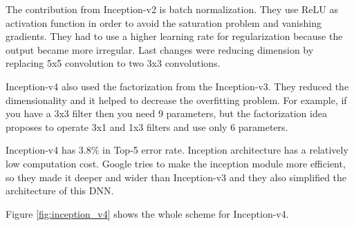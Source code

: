 \documentclass[titlepage]{report}
\begin{document}
The contribution from Inception-v2 is batch normalization. They use ReLU as activation function in order to avoid the saturation problem and vanishing gradients. They had to use a higher learning rate for regularization because the output became more irregular. Last changes were reducing dimension by replacing  5x5 convolution to two 3x3 convolutions. 

Inception-v4 also used the factorization from the Inception-v3. They reduced the dimensionality and it helped to decrease the overfitting problem. For example, if you have a 3x3 filter then you need 9 parameters, but the factorization idea proposes to operate 3x1 and 1x3 filters and use only 6 parameters. 

Inception-v4 has 3.8\% in Top-5 error rate. Inception architecture has a relatively low computation cost. Google tries to make the inception module more efficient, so they made it deeper and wider than Inception-v3 and they also simplified the architecture of this DNN.

Figure \ref{fig:inception_v4} shows the whole scheme for Inception-v4.
\end{document}
